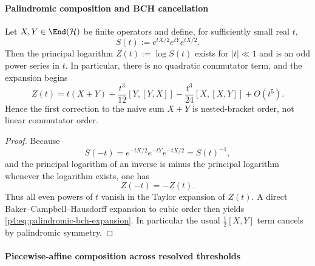 \documentclass[12pt,a4paper]{article}
\begin{document}
\paragraph{Palindromic composition and BCH cancellation}
\label{p4:sec:part2-palindromic-bch}

\begin{theorem}
\label{p4:thm:palindromic-bch}
Let $X,Y\in\End(\mathcal H)$ be finite operators and define, for sufficiently small real $t$,
\begin{equation}
\label{p4:eq:palindromic-composition}
S(t):=e^{tX/2}e^{tY}e^{tX/2}.
\end{equation}
Then the principal logarithm $Z(t):=\log S(t)$ exists for $|t|\ll1$ and is an odd power series in $t$.
In particular, there is no quadratic commutator term, and the expansion begins
\begin{equation}
\label{p4:eq:palindromic-bch-expansion}
Z(t)
=
t(X+Y)
+
\frac{t^3}{12}[Y,[Y,X]]
-
\frac{t^3}{24}[X,[X,Y]]
+
O(t^5).
\end{equation}
Hence the first correction to the naive sum $X+Y$ is nested-bracket order, not linear commutator order.
\end{theorem}

\begin{proof}
Because
\[
S(-t)=e^{-tX/2}e^{-tY}e^{-tX/2}=S(t)^{-1},
\]
and the principal logarithm of an inverse is minus the principal logarithm whenever the logarithm exists, one has
\[
Z(-t)=-Z(t).
\]
Thus all even powers of $t$ vanish in the Taylor expansion of $Z(t)$.
A direct Baker--Campbell--Hausdorff expansion to cubic order then yields \eqref{p4:eq:palindromic-bch-expansion}.
In particular the usual $\tfrac12[X,Y]$ term cancels by palindromic symmetry.
\end{proof}



\paragraph{Piecewise-affine composition across resolved thresholds}
\label{p4:sec:part2-piecewise-affine-thresholds}
\end{document}
